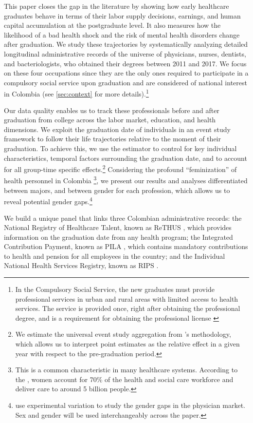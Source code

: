 \documentclass[12pt, a4paper]{article}
\begin{document}
This paper closes the gap in the literature by showing how early healthcare graduates behave in terms of their labor supply decisions, earnings, and human capital accumulation at the postgraduate level. It also measures how the likelihood of a bad health shock and the risk of mental health disorders change after graduation. We study these trajectories by systematically analyzing detailed longitudinal administrative records of the universe of physicians, nurses, dentists, and bacteriologists, who obtained their degrees between 2011 and 2017. We focus on these four occupations since they are the only ones required to participate in a compulsory social service upon graduation and are considered of national interest in Colombia (see \autoref{sec:context} for more details).\footnote{In the Compulsory Social Service, the new graduates must provide professional services in urban and rural areas with limited access to health services. The service is provided once, right after obtaining the professional degree, and is a requirement for obtaining the professional license \citep{Minsalud2007}} 

Our data quality enables us to track these professionals before and after graduation from college across the labor market, education, and health dimensions. We exploit the graduation date of individuals in an event study framework to follow their life trajectories relative to the moment of their graduation. To achieve this, we use the \citet{callaway2021difference} estimator to control for key individual characteristics, temporal factors surrounding the graduation date, and to account for all group-time specific effects.\footnote{We estimate the universal event study aggregation from \citet{callaway2021difference}'s methodology, which allows us to interpret point estimates as the relative effect in a given year with respect to the pre-graduation period.} Considering the profound ``feminization'' of health personnel in Colombia \citep{Minsalud2018}\footnote{This is a common characteristic in many healthcare systems. According to the \citet{WHO2019}, women account for 70\% of the health and social care workforce and deliver care to around 5 billion people.}, we present our results and analyses differentiated between majors, and between gender for each profession, which allows us to reveal potential gender gaps.\footnote{\cite{Posso2024gender} use experimental variation to study the gender gaps in the physician market. Sex and gender will be used interchangeably across the paper.}

We build a unique panel that links three Colombian administrative records: the National Registry of Healthcare Talent, known as ReTHUS \citep{baserethus}, which provides information on the graduation date from any health program; the Integrated Contribution Payment, known as PILA \citep{basepila}, which contains mandatory contributions to health and pension for all employees in the country; and the Individual National Health Services Registry, known as RIPS \citep{baserips}.
\end{document}
